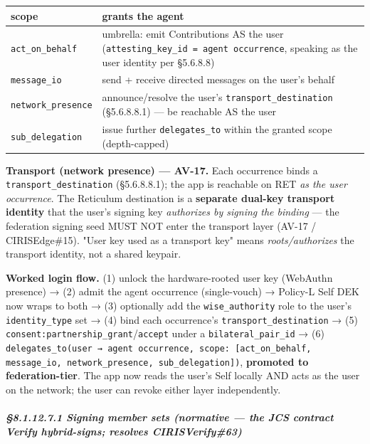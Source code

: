 \documentclass[11pt]{article}
\begin{document}
{\footnotesize
\begin{longtable}{|p{8.0cm}|p{8.0cm}|}\hline
\textbf{scope} & \textbf{grants the agent} \\ \hline\endhead
\texttt{act\_on\_behalf} & umbrella: emit Contributions AS the user (\texttt{attesting\_key\_id = agent occurrence}, speaking as the user identity per §5.6.8.8) \\ \hline
\texttt{message\_io} & send + receive directed messages on the user's behalf \\ \hline
\texttt{network\_presence} & announce/resolve the user's \texttt{transport\_destination} (§5.6.8.8.1) — be reachable AS the user \\ \hline
\texttt{sub\_delegation} & issue further \texttt{delegates\_to} within the granted scope (depth-capped) \\ \hline
\end{longtable}}


\textbf{Transport (network presence) — AV-17.} Each occurrence binds a \texttt{transport\_destination} (§5.6.8.8.1); the app is reachable on RET \textit{as the user occurrence}. The Reticulum destination is a \textbf{separate dual-key transport identity} that the user's signing key \textit{authorizes by signing the binding} — the federation signing seed MUST NOT enter the transport layer (AV-17 / CIRISEdge\#15). "User key used as a transport key" means \textit{roots/authorizes} the transport identity, not a shared keypair.


\textbf{Worked login flow.} (1) unlock the hardware-rooted user key (WebAuthn presence) → (2) admit the agent occurrence (single-vouch) → Policy-L Self DEK now wraps to both → (3) optionally add the \texttt{wise\_authority} role to the user's \texttt{identity\_type} set → (4) bind each occurrence's \texttt{transport\_destination} → (5) \texttt{consent:partnership\_grant}/\texttt{accept} under a \texttt{bilateral\_pair\_id} → (6) \texttt{delegates\_to(user → agent occurrence, scope: [act\_on\_behalf, message\_io, network\_presence, sub\_delegation])}, \textbf{promoted to federation-tier}. The app now reads the user's Self locally AND acts as the user on the network; the user can revoke either layer independently.


\subparagraph{§8.1.12.7.1 Signing member sets (normative — the JCS contract Verify hybrid-signs; resolves CIRISVerify\#63)}\mbox{}\\
\end{document}
